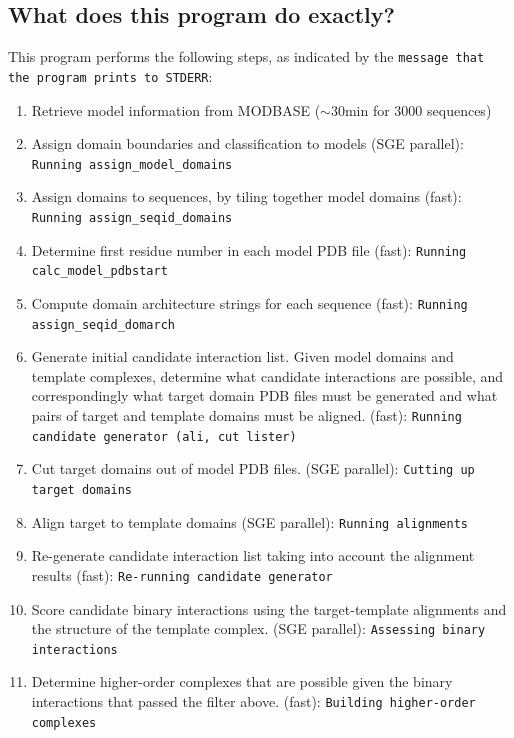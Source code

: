 \documentclass[11pt]{article}
\begin{document}
\subsection{What does this program do exactly?}
This program performs the following steps, as indicated by the {\tt message that the program prints to STDERR}:

\begin{enumerate}

\item Retrieve model information from MODBASE ($\sim$30min for 3000 sequences)

\item Assign domain boundaries and classification to models (SGE parallel): 
{\tt Running assign\_model\_domains}

\item Assign domains to sequences, by tiling together model domains (fast): 
{\tt Running assign\_seqid\_domains}

\item Determine first residue number in each model PDB file (fast): {\tt Running calc\_model\_pdbstart}

\item Compute domain architecture strings for each sequence (fast): {\tt Running assign\_seqid\_domarch}

\item Generate initial candidate interaction list. Given model domains and template complexes, determine what candidate interactions are possible, and correspondingly what target domain PDB files must be generated and what pairs of target and template domains must be aligned. (fast): {\tt Running candidate generator (ali, cut lister)}

\item Cut target domains out of model PDB files. (SGE parallel):
{\tt Cutting up target domains}

\item Align target to template domains (SGE parallel):
{\tt Running alignments}

\item Re-generate candidate interaction list taking into account the alignment results (fast): {\tt Re-running candidate generator}

\item Score candidate binary interactions using the target-template alignments and the structure of the template complex. (SGE parallel): {\tt Assessing binary interactions}

\item Determine higher-order complexes that are possible given the binary interactions that passed the filter above. (fast): {\tt Building higher-order complexes}
\end{enumerate}
\end{document}
